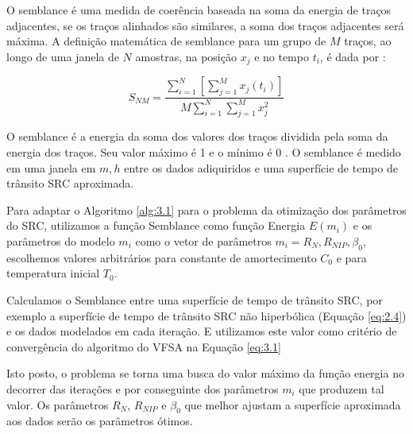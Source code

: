 O semblance é uma medida de coerência baseada na soma da energia de traços adjacentes, se os traços alinhados são similares,
a soma dos traços adjacentes será máxima. A definição matemática de semblance para um grupo de $M$ traços, ao 
longo de uma janela de $N$ amostras, na posição $x_j$ e no tempo $t_i$, é dada por \cite{seg}:

\begin{equation}
\label{eq:3.9}
 S_{NM}=\frac{ \sum_{i=1}^N [\sum_{j=1}^M x_j(t_i)]}{M \sum_{i=1}^N \sum_{j=1}^Mx^2_{j}}
\end{equation}

O semblance é a energia da soma dos valores dos traços dividida pela soma da energia dos traços. 
Seu valor máximo é 1 e o mínimo é 0 \cite{seg}. O semblance é medido em uma janela em $m, h$ entre os dados adiquiridos 
e uma superfície de tempo de
trânsito SRC aproximada. 

Para adaptar o Algoritmo \ref{alg:3.1} para o problema da otimização dos parâmetros do SRC, utilizamos a
função Semblance como função Energia $E(m_i)$ e os parâmetros do modelo $m_i$ como o vetor
de parâmetros $m_i={R_N,R_{NIP},\beta_0}$, escolhemos valores arbitrários para constante de amortecimento $C_0$ e
para temperatura inicial $T_0$.

Calculamos o Semblance entre uma superfície de tempo de trânsito SRC, por exemplo a
superfície de tempo de trânsito SRC não hiperbólica (Equação \ref{eq:2.4}) 
e os dados modelados em cada iteração. E utilizamos este valor como critério de
convergência do algoritmo do VFSA na Equação \ref{eq:3.1} 

Isto posto, o problema se torna
uma busca do valor máximo da função energia no decorrer das iterações e por conseguinte dos parâmetros $m_i$ que
produzem tal valor. Os parâmetros $R_N$, $R_{NIP}$ e $\beta_0$ que melhor
ajustam a superfície aproximada aos dados serão os parâmetros ótimos.